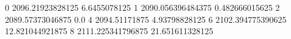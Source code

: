0 2096.21923828125 6.6455078125
1 2090.056396484375 0.482666015625
2 2089.57373046875 0.0
4 2094.51171875 4.93798828125
6 2102.394775390625 12.821044921875
8 2111.225341796875 21.651611328125
